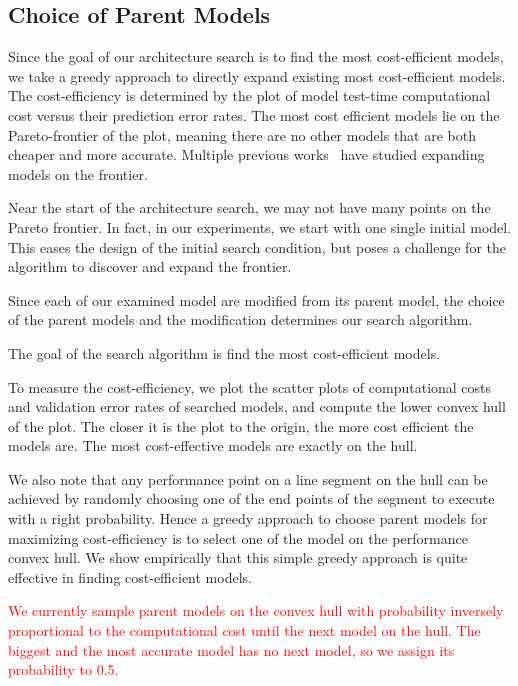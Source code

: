 \documentclass{article}
\newcommand{\todo}[1]{\textcolor{red}{#1}}
\begin{document}
\subsection{Choice of Parent Models}
\label{sec:parent_choice}


Since the goal of our architecture search is to find the most cost-efficient models, we take a greedy approach to directly expand existing most cost-efficient models. The cost-efficiency is determined by the plot of model test-time computational cost versus their prediction error rates. The most cost efficient models lie on the Pareto-frontier of the plot, meaning there are no other models that are both cheaper and more accurate. Multiple previous works~\citep{Elsken2018EfficientMN, Hsu2018MONASMN} have studied expanding models on the frontier. 

Near the start of the architecture search, we may not have many points on the Pareto frontier. In fact, in our experiments, we start with one single initial model. This eases the design of the initial search condition, but poses a challenge for the algorithm to discover and expand the frontier. 




Since each of our examined model are modified from its parent model, the choice of the parent models and the modification determines our search algorithm. 



The goal of the search algorithm is find the most cost-efficient models. 


To measure the cost-efficiency, we plot the scatter plots of computational costs and validation error rates of searched models, and compute the lower convex hull of the plot. The closer it is the plot to the origin, the more cost efficient the models are. The most cost-effective models are exactly on the hull. 


We also note that any performance point on a line segment on the hull can be achieved by randomly choosing one of the end points of the segment to execute with a right probability. Hence a greedy approach to choose parent models for maximizing cost-efficiency is to select one of the model on the performance convex hull. We show empirically that this simple greedy approach is quite effective in finding cost-efficient models. 


\todo{We currently sample parent models on the convex hull with probability inversely proportional to the computational cost until the next model on the hull. The biggest and the most accurate model has no next model, so we assign its probability to 0.5.}
\end{document}
